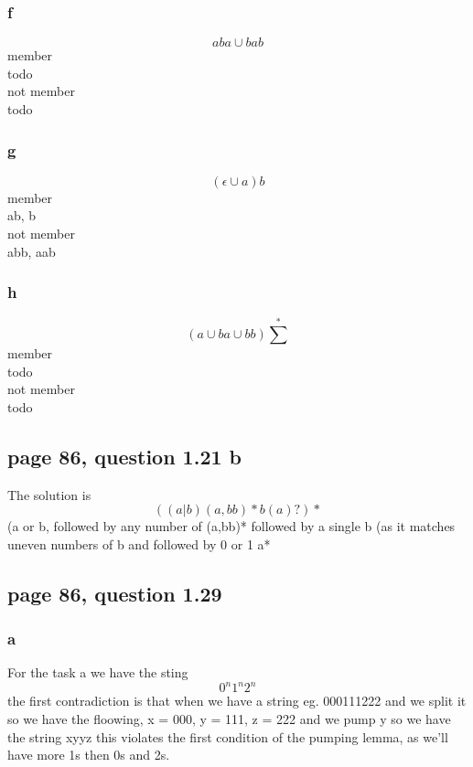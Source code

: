 \documentclass[a4paper,10pt,titlepage]{report}
\begin{document}
\begin{multicols}{2}
\subsubsection{f}
\begin{equation}
aba \cup bab
\end{equation}
member \\
todo\\
not member\\
todo\\
\subsubsection{g}
\begin{equation}
(\epsilon \cup a)b
\end{equation}
member\\
ab, b\\
not member\\
abb, aab\\
\subsubsection{h}
\begin{equation}
(a\cup ba \cup bb)\sum^*
\end{equation}
member\\
todo\\
not member\\
todo \\
\end{multicols}
\subsection{page 86, question 1.21 b}

The solution is 
\begin{equation}
((a|b)(a,bb)*b(a)?)*
\end{equation}
(a or b, followed by any number of (a,bb)* followed by a single b (as it matches uneven numbers of b and followed by 0 or 1 a*

\subsection{page 86, question 1.29}

\subsubsection{a}

For the task a we have the sting 
\begin{equation}
0^n1^n2^n
\end{equation}
the first contradiction is that when we have a string eg. 000111222 and we split it so we have the floowing, x = 000, y = 111, z = 222 and we pump y so we have the string xyyz this violates the first condition of the pumping lemma, as we'll have more 1s then 0s and 2s.
\end{document}

